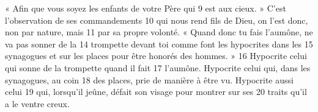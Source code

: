 « Afin que vous soyez les enfants de votre Père qui	 
9	 	est aux cieux. » C'est l'observation de ses commandements	 
10	 	qui nous rend fils de Dieu, on l'est donc, non par nature, mais	 
11	 	par sa propre volonté.
« Quand donc tu fais l'aumône, ne va pas sonner de la	 
14	 	trompette devant toi comme font les hypocrites dans les	 
15	 	synagogues et sur les places pour être honorés des hommes. »	 
16	 	Hypocrite celui qui sonne de la trompette quand il fait	 
17	 	l'aumône. Hypocrite celui qui, dans les synagogues, au coin	 
18	 	des places, prie de manière à être vu. Hypocrite aussi celui	 
19	 	qui, lorsqu'il jeûne, défait son visage pour montrer sur ses	 
20	 	traits qu'il a le ventre creux.